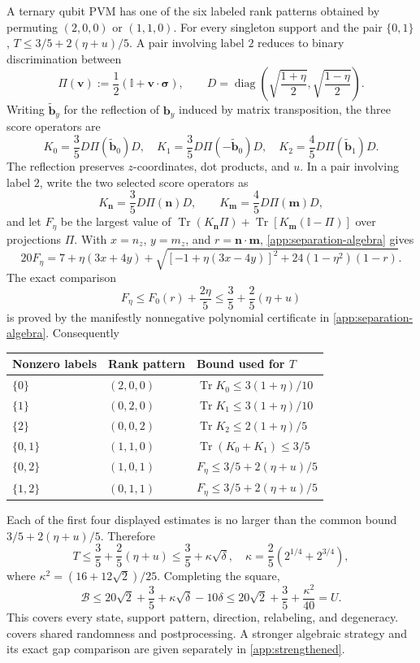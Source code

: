 \documentclass[11pt]{article}
\theoremstyle{definition}
\newcommand{\Tr}{\operatorname{Tr}}
\newcommand{\id}{\mathbb I}
\newcommand{\Bell}{\mathcal B}
\begin{document}
A ternary qubit PVM has one of the six labeled rank patterns obtained by
permuting \((2,0,0)\) or \((1,1,0)\). For every singleton support and the
pair \(\{0,1\}\), \(T\le3/5+2(\eta+u)/5\). A pair involving label \(2\)
reduces to binary discrimination between
\[
\Pi(\bm v):=\frac12(\id+\bm v\cdot\bm\sigma),\qquad
D=\operatorname{diag}\!\left(
\sqrt{\frac{1+\eta}{2}},\sqrt{\frac{1-\eta}{2}}\right).
\]
Writing \(\widetilde{\bm b}_y\) for the reflection of \(\bm b_y\) induced by
matrix transposition, the three score operators are
\[
K_0=\frac35D\Pi(\widetilde{\bm b}_0)D,\quad
K_1=\frac35D\Pi(-\widetilde{\bm b}_0)D,\quad
K_2=\frac45D\Pi(\widetilde{\bm b}_1)D.
\]
The reflection preserves \(z\)-coordinates, dot products, and \(u\). In a
pair involving label \(2\), write the two selected score operators as
\[
K_{\bm n}=\frac35D \Pi(\bm n)D,\qquad
K_{\bm m}=\frac45D \Pi(\bm m)D,
\]
and let \(F_\eta\) be the largest value of
\(\Tr(K_{\bm n}\Pi)+\Tr[K_{\bm m}(\id-\Pi)]\) over projections \(\Pi\).
With \(x=n_z\), \(y=m_z\), and \(r=\bm n\cdot\bm m\), \cref{app:separation-algebra}
gives
\[
20F_\eta
=7+\eta(3x+4y)
+\sqrt{[-1+\eta(3x-4y)]^2+24(1-\eta^2)(1-r)}.
\]
The exact comparison
\[
F_\eta\le F_0(r)+\frac{2\eta}{5}
\le\frac35+\frac25(\eta+u)
\]
is proved by the manifestly nonnegative polynomial certificate in
\cref{app:separation-algebra}. Consequently
\begin{center}
\small
\begin{tabular}{@{}lll@{}}
\toprule
Nonzero labels & Rank pattern & Bound used for \(T\)\\
\midrule
\(\{0\}\) & \((2,0,0)\) & \(\Tr K_0\le3(1+\eta)/10\)\\
\(\{1\}\) & \((0,2,0)\) & \(\Tr K_1\le3(1+\eta)/10\)\\
\(\{2\}\) & \((0,0,2)\) & \(\Tr K_2\le2(1+\eta)/5\)\\
\(\{0,1\}\) & \((1,1,0)\) & \(\Tr(K_0+K_1)\le3/5\)\\
\(\{0,2\}\) & \((1,0,1)\) & \(F_\eta\le3/5+2(\eta+u)/5\)\\
\(\{1,2\}\) & \((0,1,1)\) & \(F_\eta\le3/5+2(\eta+u)/5\)\\
\bottomrule
\end{tabular}
\end{center}
Each of the first four displayed estimates is no larger than the common
bound \(3/5+2(\eta+u)/5\). Therefore
\[
T\le\frac35+\frac25(\eta+u)
\le\frac35+\kappa\sqrt\delta,
\quad
\kappa=\frac25(2^{1/4}+2^{3/4}),
\]
where \(\kappa^2=(16+12\sqrt2)/25\). Completing the square,
\[
\Bell\le20\sqrt2+\frac35+\kappa\sqrt\delta-10\delta
\le20\sqrt2+\frac35+\frac{\kappa^2}{40}=U.
\]
This covers every state, support pattern, direction, relabeling, and
degeneracy.  covers shared randomness and
postprocessing. A stronger algebraic strategy and its exact gap comparison
are given separately in \cref{app:strengthened}.
\end{document}
